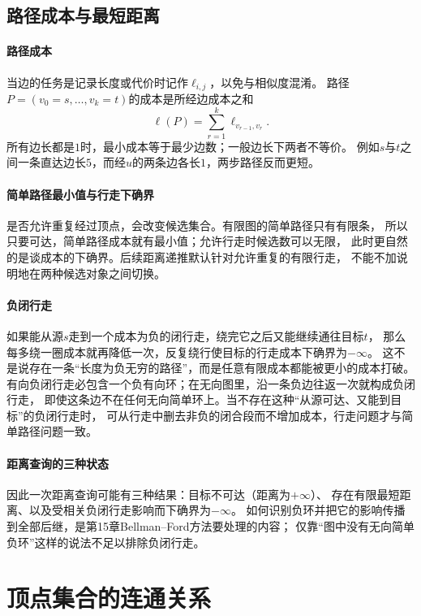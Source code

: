 \subsection{路径成本与最短距离}

\paragraph{路径成本}
当边的任务是记录长度或代价时记作$\ell_{i,j}$，以免与相似度混淆。
路径$P=(v_0=s,\ldots,v_k=t)$的成本是所经边成本之和
\[
  \ell(P)=\sum_{r=1}^k\ell_{v_{r-1},v_r}.
\]
所有边长都是$1$时，最小成本等于最少边数；一般边长下两者不等价。
例如$s$与$t$之间一条直达边长$5$，而经$u$的两条边各长$1$，两步路径反而更短。

\paragraph{简单路径最小值与行走下确界}
是否允许重复经过顶点，会改变候选集合。有限图的简单路径只有有限条，
所以只要可达，简单路径成本就有最小值；允许行走时候选数可以无限，
此时更自然的是谈成本的下确界。后续距离递推默认针对允许重复的有限行走，
不能不加说明地在两种候选对象之间切换。

\paragraph{负闭行走}
如果能从源$s$走到一个成本为负的闭行走，绕完它之后又能继续通往目标$t$，
那么每多绕一圈成本就再降低一次，反复绕行使目标的行走成本下确界为$-\infty$。
这不是说存在一条“长度为负无穷的路径”，而是任意有限成本都能被更小的成本打破。
有向负闭行走必包含一个负有向环；在无向图里，沿一条负边往返一次就构成负闭行走，
即使这条边不在任何无向简单环上。当不存在这种“从源可达、又能到目标”的负闭行走时，
可从行走中删去非负的闭合段而不增加成本，行走问题才与简单路径问题一致。

\paragraph{距离查询的三种状态}
因此一次距离查询可能有三种结果：目标不可达（距离为$+\infty$）、
存在有限最短距离、以及受相关负闭行走影响而下确界为$-\infty$。
如何识别负环并把它的影响传播到全部后继，是第15章Bellman--Ford方法要处理的内容；
仅靠“图中没有无向简单负环”这样的说法不足以排除负闭行走。

\section{顶点集合的连通关系}

